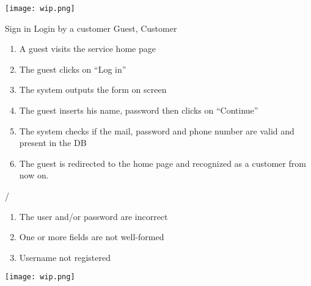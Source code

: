 \pagebreak
\texttt{[image: wip.png]}

\usecase
{Sign in}
{Login by a customer}
{Guest, Customer}
{
\begin{enumerate}
	\item A guest visits the service home page
	\item The guest clicks on ``Log in''
	\item The system outputs the form on screen
	\item The guest inserts his name, password then clicks on ``Continue''
	\item The system checks if the mail, password and phone number are valid and present in the DB
	\item The guest is redirected to the home page and recognized as a customer from now on.
\end{enumerate}
}
{
/
}
{ \begin{enumerate}
	\item The user and/or password are incorrect
	\item One or more fields are not well-formed
	\item Username not registered
\end{enumerate} }

\pagebreak
\texttt{[image: wip.png]}


